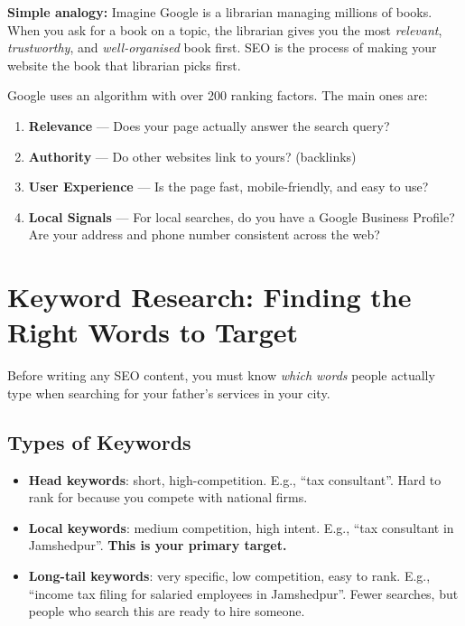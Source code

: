 \documentclass[12pt, a4paper]{book}
\begin{document}
\begin{tcolorbox}[notebox]
\textbf{Simple analogy:} Imagine Google is a librarian managing millions of books.
When you ask for a book on a topic, the librarian gives you the most
\emph{relevant}, \emph{trustworthy}, and \emph{well-organised} book first.
SEO is the process of making your website the book that librarian picks first.
\end{tcolorbox}

Google uses an algorithm with over 200 ranking factors. The main ones are:

\begin{enumerate}[leftmargin=1.5em]
  \item \textbf{Relevance} --- Does your page actually answer the search query?
  \item \textbf{Authority} --- Do other websites link to yours? (backlinks)
  \item \textbf{User Experience} --- Is the page fast, mobile-friendly, and easy to use?
  \item \textbf{Local Signals} --- For local searches, do you have a Google Business Profile?
        Are your address and phone number consistent across the web?
\end{enumerate}

\section{Keyword Research: Finding the Right Words to Target}

Before writing any SEO content, you must know \emph{which words} people actually type
when searching for your father's services in your city.

\subsection{Types of Keywords}

\begin{itemize}[leftmargin=1.5em]
  \item \textbf{Head keywords}: short, high-competition. E.g., ``tax consultant''.
        Hard to rank for because you compete with national firms.
  \item \textbf{Local keywords}: medium competition, high intent. E.g., ``tax consultant in Jamshedpur''.
        \textbf{This is your primary target.}
  \item \textbf{Long-tail keywords}: very specific, low competition, easy to rank.
        E.g., ``income tax filing for salaried employees in Jamshedpur''.
        Fewer searches, but people who search this are ready to hire someone.
\end{itemize}
\end{document}
